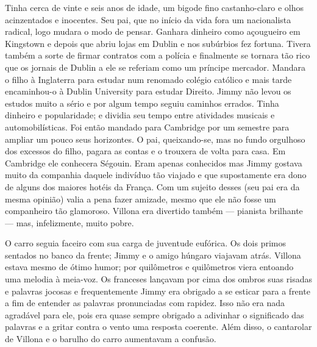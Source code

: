 Tinha cerca de vinte e seis anos de idade, um bigode fino castanho-claro e
olhos acinzentados e inocentes.  Seu pai, que no início da vida fora um
nacionalista radical, logo mudara o modo de pensar.  Ganhara dinheiro como
açougueiro em Kingstown e depois que abriu lojas em Dublin e nos subúrbios fez
fortuna.  Tivera também a sorte de firmar contratos com a polícia e finalmente
se tornara tão rico que os jornais de Dublin a ele se referiam como um príncipe
mercador.  Mandara o filho à Inglaterra para estudar num renomado colégio
católico e mais tarde encaminhou-o à Dublin University para estudar Direito.
Jimmy não levou os estudos muito a sério e por algum tempo seguiu caminhos
errados.  Tinha dinheiro e popularidade; e dividia seu tempo entre atividades
musicais e automobilísticas.  Foi então mandado para Cambridge por um semestre
para ampliar um pouco seus horizontes.  O pai, queixando-se, mas no fundo
orgulhoso dos excessos do filho, pagara as contas e o trouxera de volta para
casa.  Em Cambridge ele conhecera Ségouin.  Eram apenas conhecidos mas Jimmy
gostava muito da companhia daquele indivíduo tão viajado e que supostamente era
dono de alguns dos maiores hotéis da França.  Com um sujeito desses (seu pai
era da mesma opinião) valia a pena fazer amizade, mesmo que ele não fosse um
companheiro tão glamoroso.  Villona era divertido também --- pianista brilhante
--- mas, infelizmente, muito pobre.

O carro seguia faceiro com sua carga de juventude eufórica.  Os dois primos
sentados no banco da frente; Jimmy e o amigo húngaro viajavam atrás.  Villona
estava mesmo de ótimo humor; por quilômetros e quilômetros viera entoando uma
melodia à meia-voz.  Os franceses lançavam por cima dos ombros suas risadas e
palavras jocosas e frequentemente Jimmy era obrigado a se esticar para a frente
a fim de entender as palavras pronunciadas com rapidez.  Isso não era nada
agradável para ele, pois era quase sempre obrigado a adivinhar o significado
das palavras e a gritar contra o vento uma resposta coerente.  Além disso, o
cantarolar de Villona e o barulho do carro aumentavam a confusão.

